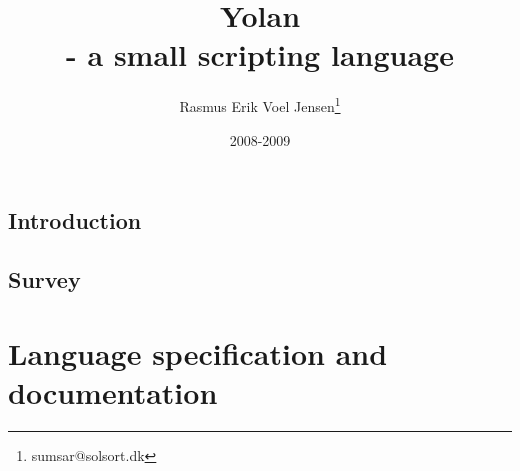 \documentclass[12pt]{report}
\title{Yolan \\ - a small scripting language}
\author{
  Rasmus Erik Voel Jensen\footnote{
    sumsar@solsort.dk
  }
}
\date{2008-2009}
\begin{document}


\nocite{sicp}



\chapter{Introduction}
\chapter{Survey}


\part{Language specification and documentation}
\end{document}
